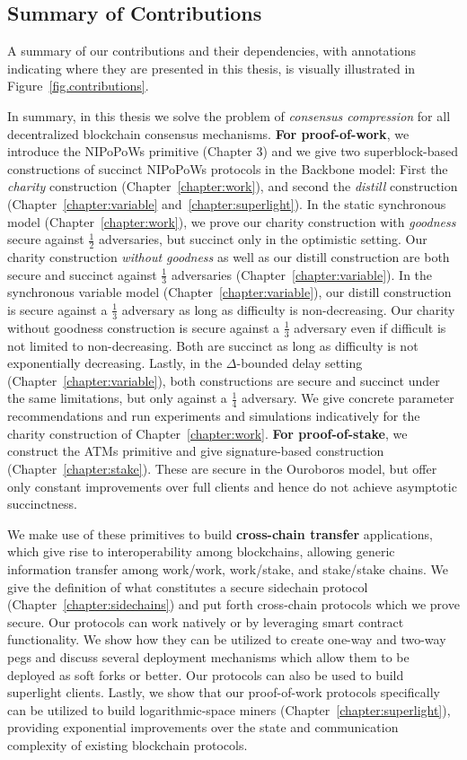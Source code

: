 \subsection{Summary of Contributions}
A summary of our contributions and their dependencies, with annotations
indicating where they are presented in this thesis, is visually illustrated in
Figure~\ref{fig.contributions}.

In summary, in this thesis we solve the problem of \emph{consensus compression}
for all decentralized blockchain consensus mechanisms. \textbf{For
proof-of-work}, we introduce the NIPoPoWs primitive (Chapter 3) and we give two
superblock-based constructions of succinct NIPoPoWs protocols in the Backbone
model: First the \emph{charity} construction (Chapter~\ref{chapter:work}), and
second the \emph{distill} construction (Chapter~\ref{chapter:variable}
and~\ref{chapter:superlight}). In the static synchronous model
(Chapter~\ref{chapter:work}), we prove our charity construction with
\emph{goodness} secure against $\frac{1}{2}$ adversaries, but succinct only in
the optimistic setting. Our charity construction \emph{without goodness} as well
as our distill construction are both secure and succinct against $\frac{1}{3}$
adversaries (Chapter~\ref{chapter:variable}). In the synchronous variable model
(Chapter~\ref{chapter:variable}), our distill construction is secure against a
$\frac{1}{3}$ adversary as long as difficulty is non-decreasing. Our charity
without goodness construction is secure against a $\frac{1}{3}$ adversary even
if difficult is not limited to non-decreasing. Both are succinct as long as
difficulty is not exponentially decreasing. Lastly, in the $\Delta$-bounded
delay setting (Chapter~\ref{chapter:variable}), both constructions are secure
and succinct under the same limitations, but only against a $\frac{1}{4}$
adversary. We give concrete parameter recommendations and run experiments and
simulations indicatively for the charity construction of
Chapter~\ref{chapter:work}. \textbf{For proof-of-stake}, we construct the ATMs
primitive and give signature-based construction (Chapter~\ref{chapter:stake}).
These are secure in the Ouroboros model, but offer only constant improvements
over full clients and hence do not achieve asymptotic succinctness.

We make use of these primitives to build \textbf{cross-chain transfer}
applications, which give rise to interoperability among blockchains, allowing
generic information transfer among work/work, work/stake, and stake/stake
chains. We give the definition of what constitutes a secure sidechain protocol
(Chapter~\ref{chapter:sidechains}) and put forth cross-chain protocols which we
prove secure. Our protocols can work natively or by leveraging smart contract
functionality. We show how they can be utilized to create one-way and two-way
pegs and discuss several deployment mechanisms which allow them to be deployed
as soft forks or better. Our protocols can also be used to build superlight
clients. Lastly, we show that our proof-of-work protocols specifically can be
utilized to build logarithmic-space miners (Chapter~\ref{chapter:superlight}),
providing exponential improvements over the state and communication complexity
of existing blockchain protocols.

